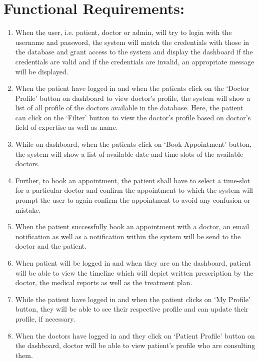 \documentclass[a4paper,12pt]{report}
\begin{document}
\section*{Functional Requirements:}
\begin{enumerate}
    \item When the user, i.e. patient, doctor or admin, will try to login with the username and password, the system will match the credentials with those in the database and grant access to the system and display the dashboard if the credentials are valid and if the credentials are invalid, an appropriate message will be displayed.
    
    \item When the patient have logged in and when the patients click on the ‘Doctor Profile’ button on dashboard to view doctor’s profile, the system will show a list of all profile of the doctors available in the database. Here, the patient can click on the ‘Filter’ button to view the doctor’s profile based on doctor’s field of expertise as well as name.
    
    \item While on dashboard, when the patients click on ‘Book Appointment’ button, the system will show a list of available date and time-slots of the available doctors. 
    
    \item Further, to book an appointment, the patient shall have to select a time-slot for a particular doctor and confirm the appointment to which the system will prompt the user to again confirm the appointment to avoid any confusion or mistake.
    
    \item When the patient successfully book an appointment with a doctor, an email notification as well as a notification within the system will be send to the doctor and the patient. 
    
    \item When patient will be logged in and when they are on the dashboard, patient will be able to view the timeline which will depict written prescription by the doctor, the medical reports as well as the treatment plan.
    
    \item While the patient have logged in and when the patient clicks on ‘My Profile’ button, they will be able to see their respective profile and can update their profile, if necessary.
    
    \item When the doctors have logged in and they click on ‘Patient Profile’ button on the dashboard, doctor will be able to view patient’s profile who are consulting them. 
    

\end{enumerate}
\end{document}
